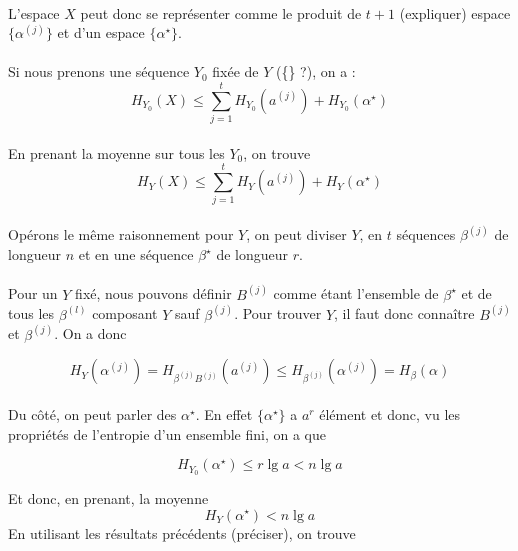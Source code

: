 	\paragraph{}
	L'espace ${X}$ peut donc se représenter comme le produit de $t+1$ (expliquer) espace $\{\alpha^{(j)}\}$ et d'un espace $\{\alpha^\star\}$.
	
	\paragraph{}
	Si nous prenons une séquence $Y_0$ fixée de $Y$ (\{\} ?), on a :
	\[H_{Y_0}(X)\le \sum_{j=1}^tH_{Y_0}\left(a^{(j)}\right)+H_{Y_0}(\alpha^\star)\]
	
	\paragraph{}
	En prenant la moyenne sur tous les $Y_0$, on trouve
	\[H_Y(X)\le \sum_{j=1}^tH_Y\left(a^{(j)}\right)+H_Y(\alpha^\star)\]
	
	\paragraph{}
	Opérons le même raisonnement pour $Y$, on peut diviser $Y$, en $t$ séquences $\beta^{(j)}$ de longueur $n$ et en une séquence ${\beta^\star}$ de longueur $r$. 
	
	\paragraph{}
	Pour un $Y$ fixé, nous pouvons définir $B^{(j)}$ comme étant l'ensemble de $\beta^\star$ et de tous les $\beta^{(l)}$ composant $Y$ sauf $\beta^{(j)}$.
	Pour trouver $Y$, il faut donc connaître $B^{(j)}$ et $\beta^{(j)}$. On a donc
	
	\[H_Y(\alpha^{(j)}) = H_{\beta^{(j)}B^{(j)}}\left(a^{(j)}\right) \le H_{\beta^{(j)}}\left(\alpha^{(j)}\right)=H_\beta(\alpha) \]
	
	\paragraph{}
	Du côté, on peut parler des $\alpha^\star$. En effet $\{\alpha^\star\}$ a $a^r$ élément et donc, vu les propriétés de l'entropie d'un ensemble fini, on a que
	
	\[H_{Y_0}(\alpha^\star) \le r\lg a < n\lg a\]
	
	Et donc, en prenant, la moyenne 
	\[H_Y(\alpha^\star) < n \lg a\]
	En utilisant les résultats précédents (préciser), on trouve
	
